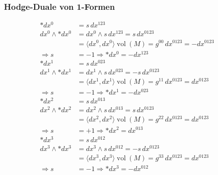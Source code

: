 \subsubsection{Hodge-Duale von 1-Formen}
\begin{align*}
	\ast dx^0 
	&= s \, dx^{123} \\
	dx^0 \wedge \ast dx^0 
	&= dx^0 \wedge s \, dx^{123} = s \, dx^{0123} \\
	&= \langle dx^0, dx^0 \rangle \operatorname{vol}(M) = g^{00} \, dx^{0123} = -dx^{0123} \\
	\Rightarrow s &= -1 \Rightarrow \boxed{\ast dx^0 = - dx^{123}}
	\\[1em]
	\ast dx^1 
	&= s \, dx^{023} \\
	dx^1 \wedge \ast dx^1 
	&= dx^1 \wedge s \, dx^{023} = -s \, dx^{0123} \\
	&= \langle dx^1, dx^1 \rangle \operatorname{vol}(M) = g^{11} \, dx^{0123} = dx^{0123} \\
	\Rightarrow s &= -1 \Rightarrow \boxed{\ast dx^1 = - dx^{023}}
	\\[1em]
	\ast dx^2 
	&= s \, dx^{013} \\
	dx^2 \wedge \ast dx^2 
	&= dx^2 \wedge s \, dx^{013} = s \, dx^{0123} \\
	&= \langle dx^2, dx^2 \rangle \operatorname{vol}(M) = g^{22} \, dx^{0123} = dx^{0123} \\
	\Rightarrow s &= +1 \Rightarrow \boxed{\ast dx^2 = dx^{013}}
	\\[1em]
	\ast dx^3 
	&= s \, dx^{012} \\
	dx^3 \wedge \ast dx^3 
	&= dx^3 \wedge s \, dx^{012} = -s \, dx^{0123} \\
	&= \langle dx^3, dx^3 \rangle \operatorname{vol}(M) = g^{33} \, dx^{0123} = dx^{0123} \\
	\Rightarrow s &= -1 \Rightarrow \boxed{\ast dx^3 = - dx^{012}}
\end{align*}
